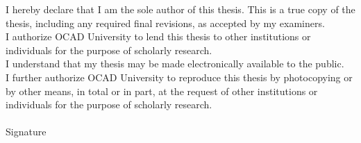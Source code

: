 I hereby declare that I am the sole author of this thesis. This is a true copy of the thesis, including any required final revisions, as accepted by my examiners.\\

I authorize OCAD University to lend this thesis to other institutions or individuals for the purpose of scholarly research.\\

I understand that my thesis may be made electronically available to the public.\\

I further authorize OCAD University to reproduce this thesis by photocopying or by other means, in total or in part, at the request of other institutions or individuals for the purpose of scholarly research.\\\\

Signature \hspace{0.1in} \makebox[3in]{\hrulefill}				%